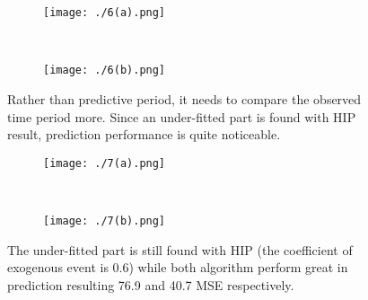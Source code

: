 \documentclass[10pt,letterpaper]{article}
\begin{document}
\begin{figure}[H]
\label{fig6}
\begin{adjustwidth}{-2.25in}{0in} %
	\centering
	\begin{subfigure}[b]{0.43\paperwidth}
	\texttt{[image: ./6(a).png]}
\caption{}
	\label{fig6(a)}
	\end{subfigure}
	~
	\begin{subfigure}[b]{0.43\paperwidth}
	\texttt{[image: ./6(b).png]}
	\caption{}
	\label{fig6(b)}
	\end{subfigure}
\caption{{Rather than predictive period, it needs to compare the observed time period more. Since an under-fitted part is found with HIP result, prediction performance is quite noticeable. }}
\end{adjustwidth}
\end{figure}

\begin{figure}[H]
\label{7}
\begin{adjustwidth}{-2.25in}{0in} %
	\centering
	\begin{subfigure}[b]{0.43\paperwidth}
	\texttt{[image: ./7(a).png]}
\caption{}
	\label{fig7(a)}
	\end{subfigure}
	~
	\begin{subfigure}[b]{0.43\paperwidth}
	\texttt{[image: ./7(b).png]}
	\caption{}
	\label{fig7(b)}
	\end{subfigure}
\caption{{The under-fitted part is still found with HIP (the coefficient of exogenous event is 0.6) while both algorithm perform great in prediction resulting 76.9 and 40.7 MSE respectively.}}
\end{adjustwidth}
\end{figure}
\end{document}
